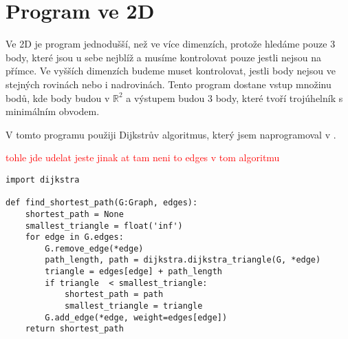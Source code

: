 \section{Program ve 2D}
\label{sec:program_2D}

Ve 2D je program jednodušší, než ve více dimenzích, protože hledáme pouze 3 body, které jsou u sebe nejblíž a musíme kontrolovat pouze jestli nejsou na přímce. Ve vyšších dimenzích budeme muset kontrolovat, jestli body nejsou ve stejných rovinách nebo i nadrovinách. Tento program dostane vstup množinu bodů, kde body budou v $\mathbb{R}^2$ a výstupem budou 3 body, které tvoří trojúhelník s minimálním obvodem. 

V tomto programu použiji Dijkstrův algoritmus, který jsem naprogramoval v . 

\textcolor{red}{tohle jde udelat jeste jinak at tam neni to edges v tom algoritmu}
\begin{lstlisting}[style=metoo]
import dijkstra

def find_shortest_path(G:Graph, edges):
    shortest_path = None
    smallest_triangle = float('inf')
    for edge in G.edges:
        G.remove_edge(*edge)
        path_length, path = dijkstra.dijkstra_triangle(G, *edge)
        triangle = edges[edge] + path_length
        if triangle  < smallest_triangle:
            shortest_path = path
            smallest_triangle = triangle
        G.add_edge(*edge, weight=edges[edge])
    return shortest_path
\end{lstlisting}